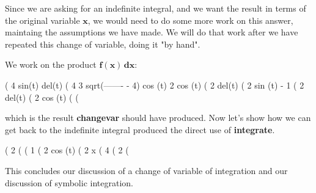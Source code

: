 \documentclass[12pt]{article}
\begin{document}
\noindent Since we are asking for an indefinite integral, and we want the result in terms
  of the original variable $\mathbf{x}$, we would need to do some more work on this answer,
  maintaing the assumptions we have made.
We will do that work after we have repeated this change of variable, doing
  it "by hand".
  
\newpage
\noindent We work on the product $\mathbf{f(x)\,dx}$:
\begin{myVerbatim}
(%
                                4 sin(t) del(t)
(%
                                   4            3
                           sqrt(------- - 4) cos (t)
                                   2
                                cos (t)
(%
                                    2 del(t)
(%
                                      2
                                   sin (t) - 1
(%
                                   2 del(t)
(%
                                      2
                                   cos (t)
(%
(%
\end{myVerbatim}
   which is the result \textbf{changevar} should have produced.
Now let's show how we can get back to the indefinite integral produced 
  the direct use of \textbf{integrate}.
\begin{myVerbatim}
(%
                                        2
(%
(%
                                        1
(%
                                        2
                                     cos (t)
(%
                                        2
                                       x
(%
                                       4
(%
                                       2
(%
\end{myVerbatim}
\normalsize
This concludes our discussion of a change of variable of integration
  and our discussion of symbolic integration.
\end{document}
